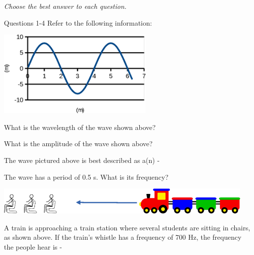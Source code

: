 \documentclass[10pt]{examdesign}
\begin{document}
\begin{multiplechoice} [title={Multiple Choice},
	rearrange=no]
	\textit{Choose the best answer to each question.} 


\begin{block}
	
Questions 1-4 Refer to the following information:

\includegraphics[width=3in]{wave.png}
 
	\begin{question}
	What is the wavelength of the wave shown above?
\end{question}

	\begin{question}
What is the amplitude of the wave shown above?
\end{question}

	
\begin{question}
	The wave pictured above is best described as a(n) - 
\end{question}


\end{block} 

\begin{question}
	The wave has a period of 0.5 s.  What is its frequency?
\end{question}

\begin{block}

	\includegraphics[width=5in]{train.png} 


\begin{question}
	A train is approaching a train station where several students are sitting in chairs, as shown above.  If the train's whistle has a frequency of 700 Hz, the frequency the people hear is - 
\end{question}
\end{block}


\end{multiplechoice}
\end{document}
